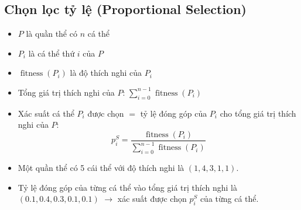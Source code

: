 \documentclass{book}
\begin{document}
\subsection{Chọn lọc tỷ lệ (Proportional Selection)}
\begin{itemize}
    \item $P$ là quần thể có $n$ cá thể
    \item $P_i$ là cá thể thứ $i$ của $P$
    \item $\operatorname{fitness}(P_i)$ là độ thích nghi của $P_i$
    \item Tổng giá trị thích nghi của $P$: $\sum_{i=0}^{n-1} \operatorname{fitness}(P_i)$
    \item Xác suất cá thể $P_i$ được chọn $= $ tỷ lệ đóng góp của $P_i$ cho tổng giá trị thích nghi của $P$:
    \begin{equation*}
        p_i^S=\frac{\operatorname{fitness}(P_i)}{\sum_{i=0}^{n-1} \operatorname{fitness}(P_i)}
    \end{equation*}
\end{itemize}
\begin{itemize}
    \item Một quần thể có 5 cái thể với độ thích nghi là $(1, 4, 3, 1, 1)$.
    \item Tỷ lệ đóng góp của từng cá thể vào tổng giá trị thích nghi là $(0.1, 0.4, 0.3, 0.1, 0.1)$ $\to$ xác suất được chọn $p^S_i$ của từng cá thể.
\end{itemize}
\end{document}
